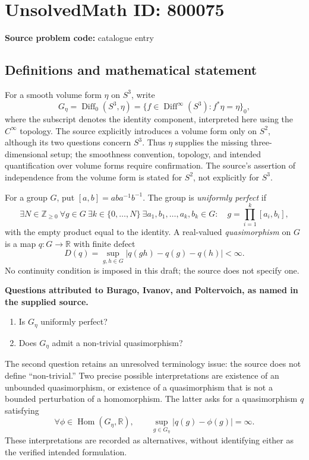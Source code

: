 \documentclass[11pt]{article}
\newcommand{\Z}{\mathbb{Z}}
\newcommand{\R}{\mathbb{R}}
\begin{document}
\section*{UnsolvedMath ID: 800075}
\textbf{Source problem code:} catalogue entry
\subsection{Definitions and mathematical statement}
For a smooth volume form \(\eta\) on \(S^3\), write
\[
G_\eta=\operatorname{Diff}_0(S^3,\eta)
=\bigl\{f\in\operatorname{Diff}^{\infty}(S^3):f^*\eta=\eta\bigr\}_0,
\]
where the subscript denotes the identity component, interpreted here using the \(C^{\infty}\) topology. The source explicitly introduces a volume form only on \(S^2\), although its two questions concern \(S^3\). Thus \(\eta\) supplies the missing three-dimensional setup; the smoothness convention, topology, and intended quantification over volume forms require confirmation. The source's assertion of independence from the volume form is stated for \(S^2\), not explicitly for \(S^3\).

For a group \(G\), put \([a,b]=aba^{-1}b^{-1}\). The group is \emph{uniformly perfect} if
\[
\exists N\in\Z_{\geq 0}\ \forall g\in G\ \exists k\in\{0,\ldots,N\}\ \exists a_1,b_1,\ldots,a_k,b_k\in G:
\quad g=\prod_{i=1}^{k}[a_i,b_i],
\]
with the empty product equal to the identity. A real-valued \emph{quasimorphism} on \(G\) is a map \(q:G\to\R\) with finite defect
\[
D(q)=\sup_{g,h\in G}|q(gh)-q(g)-q(h)|<\infty.
\]
No continuity condition is imposed in this draft; the source does not specify one.

\textbf{Questions attributed to Burago, Ivanov, and Poltervoich, as named in the supplied source.}
\begin{enumerate}
\item Is \(G_\eta\) uniformly perfect?
\item Does \(G_\eta\) admit a non-trivial quasimorphism?
\end{enumerate}
The second question retains an unresolved terminology issue: the source does not define ``non-trivial.'' Two precise possible interpretations are existence of an unbounded quasimorphism, or existence of a quasimorphism that is not a bounded perturbation of a homomorphism. The latter asks for a quasimorphism \(q\) satisfying
\[
\forall \phi\in\operatorname{Hom}(G_\eta,\R),\qquad
\sup_{g\in G_\eta}|q(g)-\phi(g)|=\infty.
\]
These interpretations are recorded as alternatives, without identifying either as the verified intended formulation.
\end{document}
